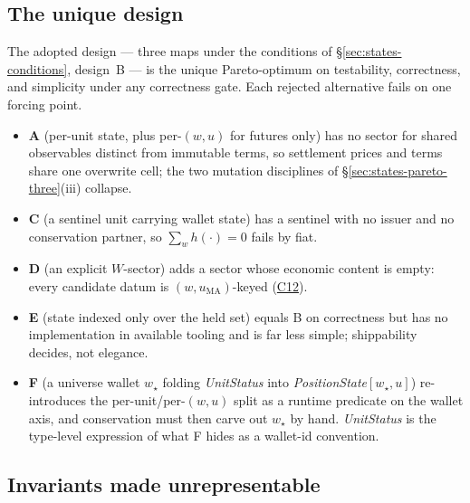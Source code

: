 \subsection{The unique design}
\label{sec:states-pareto}

The adopted design --- three maps under the conditions of \S\ref{sec:states-conditions},
design~B --- is the unique Pareto-optimum
on testability, correctness, and simplicity under any correctness gate. Each rejected
alternative fails on one forcing point.

\begin{itemize}[leftmargin=1.4em]
\item \textbf{A} (per-unit state, plus per-$(w,u)$ for futures only) has no sector for
shared observables distinct from immutable terms, so settlement prices and terms share
one overwrite cell; the two mutation disciplines of \S\ref{sec:states-pareto-three}(iii)
collapse.
\item \textbf{C} (a sentinel unit carrying wallet state) has a sentinel with no issuer and
no conservation partner, so $\sum_{w}h(\cdot)=0$ fails by fiat.
\item \textbf{D} (an explicit $W$-sector) adds a sector whose economic content is empty:
every candidate datum is $(w,u_{\mathrm{MA}})$-keyed (\hyperref[cond:C12]{C12}).
\item \textbf{E} (state indexed only over the held set) equals B on correctness but has no
implementation in available tooling and is far less simple; shippability decides, not
elegance.
\item \textbf{F} (a universe wallet $w_\star$ folding \emph{UnitStatus} into
\emph{PositionState}$[w_\star,u]$) re-introduces the per-unit/per-$(w,u)$ split as a
runtime predicate on the wallet axis, and conservation must then carve out $w_\star$ by
hand. \emph{UnitStatus} is the type-level expression of what F hides as a wallet-id
convention.
\end{itemize}

\subsection{Invariants made unrepresentable}
\label{sec:states-unrep}

